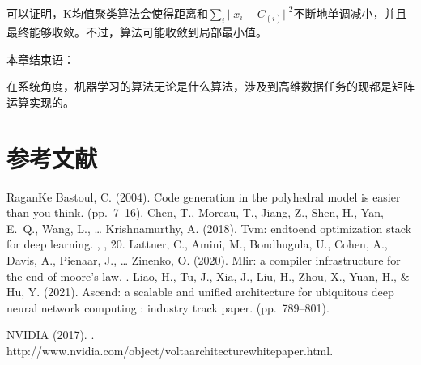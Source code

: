 \documentclass[letterpaper,10pt,english]{sphinxmanual}
\begin{document}
\sphinxAtStartPar
可以证明，K均值聚类算法会使得距离和\(\sum_i ||{x_i} - {C_{(i)}}||^2\)不断地单调减小，并且最终能够收敛。不过，算法可能收敛到局部最小值。

\sphinxAtStartPar
本章结束语：

\sphinxAtStartPar
在系统角度，机器学习的算法无论是什么算法，涉及到高维数据任务的现都是矩阵运算实现的。


\section{参考文献}
\label{\detokenize{appendix_machine_learning_introduction/classic_machine_learning:id4}}
\sphinxAtStartPar


\begin{sphinxthebibliography}{Ragan\sphinxhyphen{}Ke}
\sphinxAtStartPar
Bastoul, C. (2004). Code generation in the polyhedral model is easier than you think.  (pp. 7–16).
\sphinxAtStartPar
Chen, T., Moreau, T., Jiang, Z., Shen, H., Yan, E. Q., Wang, L., … Krishnamurthy, A. (2018). Tvm: end\sphinxhyphen{}to\sphinxhyphen{}end optimization stack for deep learning. , , 20.
\sphinxAtStartPar
Lattner, C., Amini, M., Bondhugula, U., Cohen, A., Davis, A., Pienaar, J., … Zinenko, O. (2020). Mlir: a compiler infrastructure for the end of moore’s law. .
\sphinxAtStartPar
Liao, H., Tu, J., Xia, J., Liu, H., Zhou, X., Yuan, H., \& Hu, Y. (2021). Ascend: a scalable and unified architecture for ubiquitous deep neural network computing : industry track paper.  (pp. 789–801). %
\begin{footnote}[38]\sphinxAtStartFootnote
{}
%
\end{footnote}
\sphinxAtStartPar
NVIDIA (2017). . http://www.nvidia.com/object/volta\sphinxhyphen{}architecture\sphinxhyphen{}whitepaper.html.

\end{sphinxthebibliography}
\end{document}
